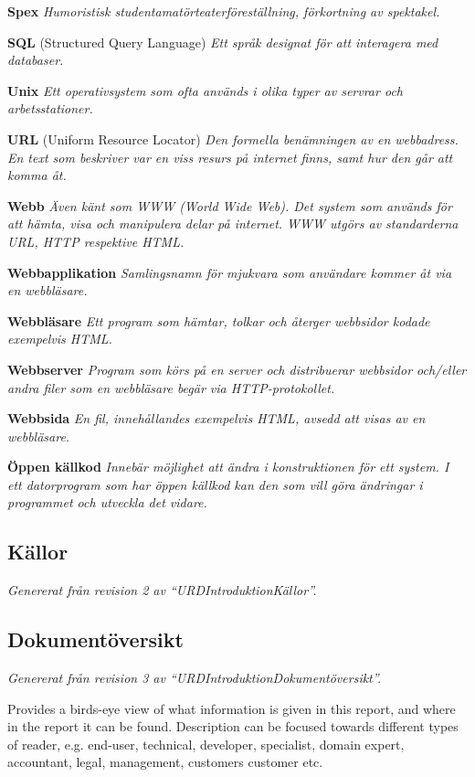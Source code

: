 \documentclass[a4paper, twoside, 11pt, titlepage]{article}
\begin{document}
	\textbf{Spex} \emph{Humoristisk studentamatörteaterföreställning, förkortning av spektakel.}

	\textbf{SQL} (Structured Query Language) \emph{Ett språk designat för att interagera med databaser.}

	\textbf{Unix} \emph{Ett operativsystem som ofta används i olika typer av servrar och arbetsstationer.}

	\textbf{URL} (Uniform Resource Locator) \emph{Den formella benämningen av en webbadress. En text som beskriver var en viss resurs på internet finns, samt hur den går att komma åt.}

	\textbf{Webb} \emph{Även känt som WWW (World Wide Web). Det system som används för att hämta, visa och manipulera delar på internet. WWW utgörs av standarderna URL, HTTP respektive HTML.}

	\textbf{Webbapplikation} \emph{Samlingsnamn för mjukvara som användare kommer åt via en webbläsare.}

	\textbf{Webbläsare} \emph{Ett program som hämtar, tolkar och återger webbsidor kodade exempelvis HTML.}

	\textbf{Webbserver} \emph{Program som körs på en server och distribuerar webbsidor och/eller andra filer som en webbläsare begär via HTTP-protokollet.}

	\textbf{Webbsida} \emph{En fil, innehållandes exempelvis HTML, avsedd att visas av en webbläsare.}

	\textbf{Öppen källkod} \emph{Innebär möjlighet att ändra i konstruktionen för ett system. I ett datorprogram som har öppen källkod kan den som vill göra ändringar i programmet och utveckla det vidare.}

	\subsection{Källor}


	\emph{Genererat från revision 2 av ``URDIntroduktionKällor''.}

	\subsection{Dokumentöversikt}


	\emph{Genererat från revision 3 av ``URDIntroduktionDokumentöversikt''.}

	Provides a birds-eye view of what information is given in this report, and where in the report it can be found. Description can be focused towards different types of reader, e.g. end-user, technical, developer, specialist, domain expert, accountant, legal, management, customers customer etc.
\end{document}
